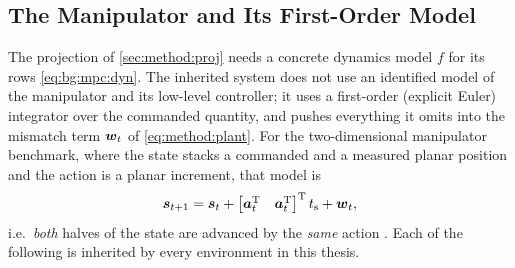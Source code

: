 \subsection{The Manipulator and Its First-Order Model}\label{sec:method:manipulator}

The projection of \autoref{sec:method:proj} needs a concrete dynamics model $f$ for its rows
\eqref{eq:bg:mpc:dyn}. The inherited system does not use an identified
model of the manipulator and its low-level controller; it uses a first-order (explicit Euler)
integrator over the commanded quantity, and pushes everything it omits into the mismatch term
$\boldsymbol{w}_{t}$ of \eqref{eq:method:plant}. For the two-dimensional manipulator benchmark, where the
state stacks a commanded and a measured planar position and the action is a planar increment, that
model is
\begin{equation}\label{eq:method:dpcc:euler}
  \boldsymbol{s}_{t+1}
  = \boldsymbol{s}_{t} + \begin{bmatrix}\boldsymbol{a}_{t}^{\textrm{T}} & \boldsymbol{a}_{t}^{\textrm{T}}\end{bmatrix}^{\textrm{T}} t_{\textrm{s}}
    + \boldsymbol{w}_{t},
\end{equation}
i.e.\ \emph{both} halves of the state are advanced by the \emph{same} action
\parencite[Sec.~6.1]{romer2025diffusion}. Each of the following is inherited by every
environment in this thesis.

